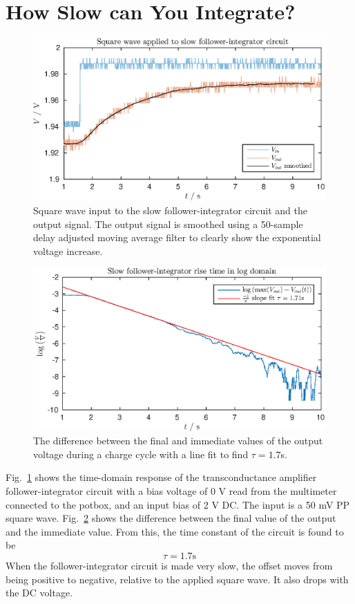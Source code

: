 \section{How Slow can You Integrate?}
\begin{figure}
    \center
    \includegraphics{ex5-step.eps}
    \caption{Square wave input to the slow follower-integrator circuit and the output signal. The output signal is smoothed using a 50-sample delay adjusted moving
    average filter to clearly show the exponential voltage increase.}
    \label{fig:ex5-1}
\end{figure}
\begin{figure}
    \center
    \includegraphics{ex5-log.eps}
    \caption{The difference between the final and immediate values of the output voltage during a charge cycle with a line fit to find \(\tau = 1.7\)s.}
    \label{fig:ex5-2}
\end{figure}
Fig.~\ref{fig:ex5-1} shows the time-domain response of the transconductance amplifier follower-integrator circuit with a bias voltage of 0 V read from the multimeter
connected to the potbox, and an input bias of 2 V DC. The input is a 50 mV PP square wave. Fig.~\ref{fig:ex5-2} shows the difference between the final value of the
output and the immediate value. From this, the time constant of the circuit is found to be
\begin{equation*}
    \tau = 1.7 \mathrm{s}
\end{equation*}
When the follower-integrator circuit is made very slow, the offset moves from being positive to negative, relative to the applied square wave. It also
drops with the DC voltage.

